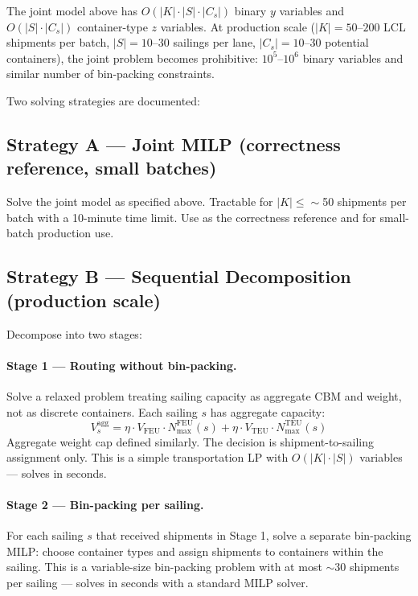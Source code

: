 \documentclass[11pt,a4paper]{article}
\theoremstyle{definition}
\begin{document}
The joint model above has $O(|K| \cdot |S| \cdot |C_s|)$ binary $y$ variables and $O(|S| \cdot |C_s|)$
container-type $z$ variables. At production scale ($|K| = 50$--$200$ LCL shipments per batch,
$|S| = 10$--$30$ sailings per lane, $|C_s| = 10$--$30$ potential containers), the joint problem
becomes prohibitive: $10^5$--$10^6$ binary variables and similar number of bin-packing constraints.

Two solving strategies are documented:

\subsection{Strategy A — Joint MILP (correctness reference, small batches)}

Solve the joint model as specified above. Tractable for $|K| \leq \sim$50 shipments per
batch with a 10-minute time limit. Use as the correctness reference and for small-batch
production use.

\subsection{Strategy B — Sequential Decomposition (production scale)}

Decompose into two stages:

\paragraph{Stage 1 — Routing without bin-packing.}
Solve a relaxed problem treating sailing capacity as aggregate CBM and weight, not as
discrete containers. Each sailing $s$ has aggregate capacity:
\[
  V_s^{\text{agg}} = \eta \cdot V_{\text{FEU}} \cdot N_{\max}^{\text{FEU}}(s) + \eta \cdot V_{\text{TEU}} \cdot N_{\max}^{\text{TEU}}(s)
\]
Aggregate weight cap defined similarly. The decision is shipment-to-sailing assignment only.
This is a simple transportation LP with $O(|K| \cdot |S|)$ variables — solves in seconds.

\paragraph{Stage 2 — Bin-packing per sailing.}
For each sailing $s$ that received shipments in Stage 1, solve a separate bin-packing MILP:
choose container types and assign shipments to containers within the sailing. This is a
variable-size bin-packing problem with at most $\sim 30$ shipments per sailing — solves in
seconds with a standard MILP solver.
\end{document}

